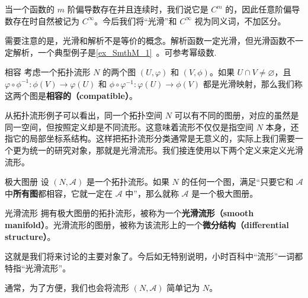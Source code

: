 当一个函数的 $m$ 阶偏导数存在并且连续时，我们说它是 $C^m$ 的，因此任意阶偏导数存在时自然被记为 $C^\infty$。今后我们将“光滑”和 $C^\infty$ 视为同义词，不加区分。

需要注意的是，光滑和解析不是等价的概念。解析函数一定光滑，但光滑函数不一定解析，一个典型例子是\autoref{ex_SmthM_1}~。可参考幂级数.

\begin{definition}{相容}
考虑一个拓扑流形 $N$ 的两个图 $(U, \varphi)$ 和 $(V, \phi)$。如果 $U\cap V\not=\varnothing$，且 $\varphi\circ\phi^{-1}:\phi(V)\rightarrow\varphi(U)$ 和 $\phi\circ\varphi^{-1}:\varphi(U)\rightarrow\phi(V)$ 都是光滑映射，那么我们称这两个图是\textbf{相容的（compatible）}。
\end{definition}

从拓扑流形例子可以看出，同一个拓扑空间 $N$ 可以有不同的图册，对应的虽然是同一空间，但按照定义却是不同流形。这意味着流形不仅仅是指空间 $N$ 本身，还指它的局部坐标系结构。这样把拓扑流形分类通常是无意义的，实际上我们需要一个更为统一的研究对象，那就是光滑流形。我们接连使用以下两个定义来定义光滑流形。

\begin{definition}{极大图册}
设 $(N, \mathcal{A})$ 是一个拓扑流形。如果 $N$ 的任何一个图，满足“只要它和 $\mathcal{A}$ 中\textbf{所有图}都相容，它就一定在 $\mathcal{A}$ 中”，那么就称 $\mathcal{A}$ 是一个极大图册。
\end{definition}

\begin{definition}{光滑流形}\label{def_Manif_3}
拥有极大图册的拓扑流形，被称为一个\textbf{光滑流形（smooth manifold）}。光滑流形的图册，被称为该流形上的一个\textbf{微分结构（differential structure）}。
\end{definition}


这就是我们将来讨论的主要对象了。今后如无特别说明，小时百科中“流形”一词都特指“光滑流形”。

通常，为了方便，我们也会将流形 $(N, \mathcal{A})$ 简单记为 $N$。





